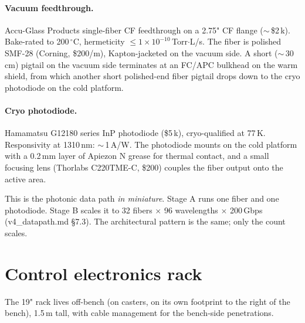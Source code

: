 \documentclass[11pt,letterpaper]{article}
\begin{document}
\paragraph{Vacuum feedthrough.} Accu-Glass Products single-fiber CF feedthrough on a 2.75" CF flange ($\sim$\,\$2\,k). Bake-rated to 200\,$^\circ$C, hermeticity $\leq 1 \times 10^{-10}$\,Torr$\cdot$L/s. The fiber is polished SMF-28 (Corning, \$200/m), Kapton-jacketed on the vacuum side. A short ($\sim$\,30\,cm) pigtail on the vacuum side terminates at an FC/APC bulkhead on the warm shield, from which another short polished-end fiber pigtail drops down to the cryo photodiode on the cold platform.

\paragraph{Cryo photodiode.} Hamamatsu G12180 series InP photodiode (\$5\,k), cryo-qualified at 77\,K. Responsivity at 1310\,nm: $\sim$\,1\,A/W. The photodiode mounts on the cold platform with a 0.2\,mm layer of Apiezon N grease for thermal contact, and a small focusing lens (Thorlabs C220TME-C, \$200) couples the fiber output onto the active area.

This is the photonic data path \textit{in miniature}. Stage A runs one fiber and one photodiode. Stage B scales it to 32 fibers $\times$ 96 wavelengths $\times$ 200\,Gbps (v4\_datapath.md \S 7.3). The architectural pattern is the same; only the count scales.

\section{Control electronics rack}

The 19" rack lives off-bench (on casters, on its own footprint to the right of the bench), 1.5\,m tall, with cable management for the bench-side penetrations.
\end{document}
